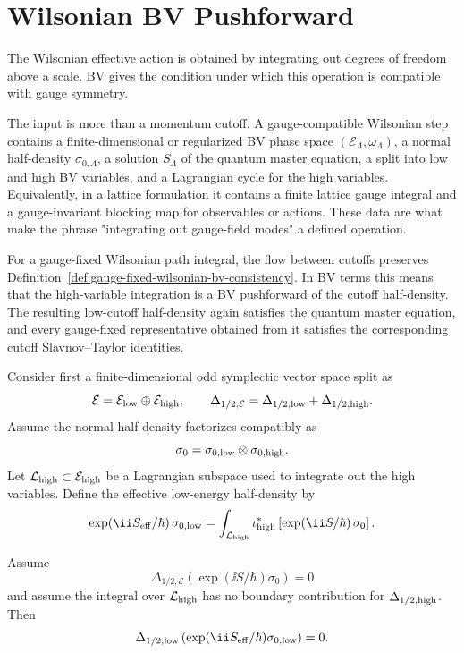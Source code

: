 \section{Wilsonian BV Pushforward}

The Wilsonian effective action is obtained by integrating out degrees of
freedom above a scale.  BV gives the condition under which this operation is
compatible with gauge symmetry.

The input is more than a momentum cutoff.  A gauge-compatible Wilsonian step
contains a finite-dimensional or regularized BV phase space
\((\mathcal E_\Lambda,\omega_\Lambda)\), a normal half-density
\(\sigma_{0,\Lambda}\), a solution \(S_\Lambda\) of the quantum master
equation, a split into low and high BV variables, and a Lagrangian cycle for
the high variables.  Equivalently, in a lattice formulation it contains a
finite lattice gauge integral and a gauge-invariant blocking map for
observables or actions.  These data are what make the phrase "integrating out
gauge-field modes" a defined operation.

For a gauge-fixed Wilsonian path integral, the flow between cutoffs preserves
Definition~\ref{def:gauge-fixed-wilsonian-bv-consistency}.  In BV terms this
means that the high-variable integration is a BV pushforward of the cutoff
half-density.  The resulting low-cutoff half-density again satisfies the
quantum master equation, and every gauge-fixed representative obtained from
it satisfies the corresponding cutoff Slavnov--Taylor identities.

Consider first a finite-dimensional odd symplectic vector space split as
\[
  \mathcal E=\mathcal E_{\rm low}\oplus\mathcal E_{\rm high},
  \qquad
  \Delta_{1/2,\mathcal E}
  =
  \Delta_{1/2,{\rm low}}+\Delta_{1/2,{\rm high}}.
\]
Assume the normal half-density factorizes compatibly as
\[
  \sigma_0=\sigma_{0,{\rm low}}\otimes\sigma_{0,{\rm high}} .
\]
Let \(\mathcal L_{\rm high}\subset\mathcal E_{\rm high}\) be a Lagrangian
subspace used to integrate out the high variables.  Define the effective
low-energy half-density by
\begin{equation}
  \exp(\ii S_{\rm eff}/\hbar)\,\sigma_{0,{\rm low}}
  =
  \int_{\mathcal L_{\rm high}}
  \iota_{\rm high}^*
  \left[
    \exp(\ii S/\hbar)\,\sigma_0
  \right].
  \label{eq:bv-wilsonian-pushforward}
\end{equation}

\begin{proposition}[BV pushforward]
Assume
\[
  \Delta_{1/2,\mathcal E}
  \left(\exp(\ii S/\hbar)\sigma_0\right)=0
\]
and assume the integral over \(\mathcal L_{\rm high}\) has no boundary
contribution for \(\Delta_{1/2,\rm high}\).  Then
\[
  \Delta_{1/2,{\rm low}}
  \left(\exp(\ii S_{\rm eff}/\hbar)\sigma_{0,{\rm low}}\right)=0 .
\]
\end{proposition}

